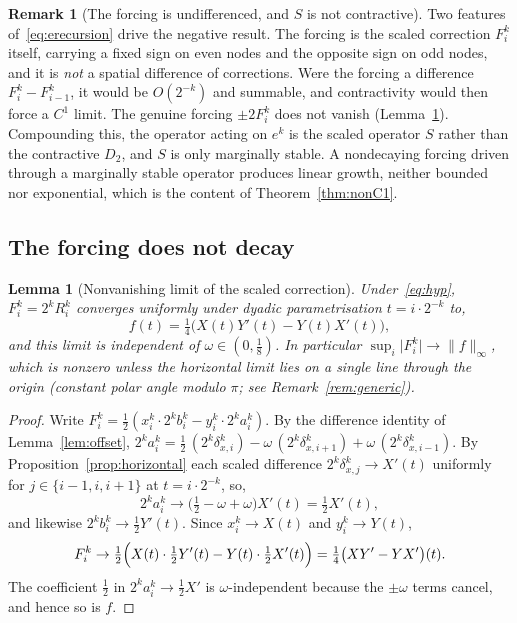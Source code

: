 \documentclass{article}
\theoremstyle{plain}
\newtheorem{lemma}[theorem]{Lemma}
\theoremstyle{definition}
\newtheorem{remark}[theorem]{Remark}
\newcommand{\norm}[1]{\lVert #1 \rVert}
\newcommand{\abs}[1]{\lvert #1 \rvert}
\begin{document}
\begin{remark}[The forcing is undifferenced, and $S$ is not contractive]\label{rem:undifferenced}
Two features of~\eqref{eq:erecursion} drive the negative result. The forcing is
the scaled correction $F_i^k$ itself, carrying a fixed sign on even nodes and the
opposite sign on odd nodes, and it is \emph{not} a spatial difference of
corrections. Were the forcing a difference $F_i^k-F_{i-1}^k$, it would be
$O(2^{-k})$ and summable, and contractivity would then force a $C^1$ limit. The
genuine forcing $\pm 2F_i^k$ does not vanish (Lemma~\ref{lem:forcing}). Compounding
this, the operator acting on $e^k$ is the scaled operator $S$ rather than the
contractive $D_2$, and $S$ is only marginally stable. A nondecaying forcing
driven through a marginally stable operator produces linear growth, neither
bounded nor exponential, which is the content of Theorem~\ref{thm:nonC1}.
\end{remark}

\subsection{The forcing does not decay}\label{sec:forcing}

\begin{lemma}[Nonvanishing limit of the scaled correction]\label{lem:forcing}
Under~\eqref{eq:hyp}, $F_i^k=2^k R_i^k$ converges uniformly under dyadic
parametrisation $t=i\cdot 2^{-k}$ to,
\begin{equation}\label{eq:flimit}
  f(t)=\tfrac14\bigl(X(t)Y'(t)-Y(t)X'(t)\bigr),
\end{equation}
and this limit is independent of $\omega\in(0,\tfrac18)$. In particular
$\sup_i\abs{F_i^k}\to\norm{f}_\infty$, which is nonzero unless the horizontal
limit lies on a single line through the origin (constant polar angle modulo
$\pi$; see Remark~\ref{rem:generic}).
\end{lemma}

\begin{proof}
Write $F_i^k=\tfrac12(x_i^k\cdot 2^k b_i^k-y_i^k\cdot 2^k a_i^k)$. By the
difference identity of Lemma~\ref{lem:offset},
$2^k a_i^k=\tfrac12\,(2^k\delta_{x,i}^k)-\omega\,(2^k\delta_{x,i+1}^k)
+\omega\,(2^k\delta_{x,i-1}^k)$. By Proposition~\ref{prop:horizontal} each
scaled difference $2^k\delta_{x,j}^k\to X'(t)$ uniformly for
$j\in\{i-1,i,i+1\}$ at $t=i\cdot 2^{-k}$, so,
\[
  2^k a_i^k\to\bigl(\tfrac12-\omega+\omega\bigr)X'(t)=\tfrac12 X'(t),
\]
and likewise $2^k b_i^k\to\tfrac12 Y'(t)$. Since $x_i^k\to X(t)$ and
$y_i^k\to Y(t)$,
\[
  F_i^k\to\tfrac12\Bigl(X(t)\cdot\tfrac12 Y'(t)-Y(t)\cdot\tfrac12 X'(t)\Bigr)
  =\tfrac14\bigl(XY'-YX'\bigr)(t).
\]
The coefficient $\tfrac12$ in $2^k a_i^k\to\tfrac12 X'$ is $\omega$-independent
because the $\pm\omega$ terms cancel, and hence so is $f$.
\end{proof}
\end{document}
